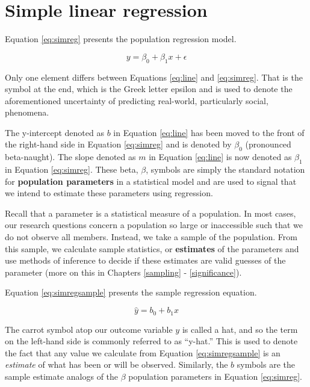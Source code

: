 \documentclass[
]{book}
\begin{document}
\hypertarget{simple-linear-regression}{%
\section{Simple linear regression}\label{simple-linear-regression}}

Equation \eqref{eq:simreg} presents the population regression model.

\begin{equation}
y=\beta_0+\beta_1x+\epsilon
\label{eq:simreg}
\end{equation}

Only one element differs between Equations \eqref{eq:line} and \eqref{eq:simreg}. That is the symbol at the end, which is the Greek letter epsilon and is used to denote the aforementioned uncertainty of predicting real-world, particularly social, phenomena.

The y-intercept denoted as \(b\) in Equation \eqref{eq:line} has been moved to the front of the right-hand side in Equation \eqref{eq:simreg} and is denoted by \(\beta_0\) (pronounced beta-naught). The slope denoted as \(m\) in Equation \eqref{eq:line} is now denoted as \(\beta_1\) in Equation \eqref{eq:simreg}. These beta, \(\beta\), symbols are simply the standard notation for \textbf{population parameters} in a statistical model and are used to signal that we intend to estimate these parameters using regression.

Recall that a parameter is a statistical measure of a population. In most cases, our research questions concern a population so large or inaccessible such that we do not observe all members. Instead, we take a sample of the population. From this sample, we calculate sample statistics, or \textbf{estimates} of the parameters and use methods of inference to decide if these estimates are valid guesses of the parameter (more on this in Chapters \ref{sampling} - \ref{significance}).

Equation \eqref{eq:simregsample} presents the sample regression equation.

\begin{equation}
\hat{y}=b_0+b_1x
\label{eq:simregsample}
\end{equation}

The carrot symbol atop our outcome variable \(y\) is called a hat, and so the term on the left-hand side is commonly referred to as ``y-hat.'' This is used to denote the fact that any value we calculate from Equation \eqref{eq:simregsample} is an \emph{estimate} of what has been or will be observed. Similarly, the \(b\) symbols are the sample estimate analogs of the \(\beta\) population parameters in Equation \eqref{eq:simreg}.
\end{document}
